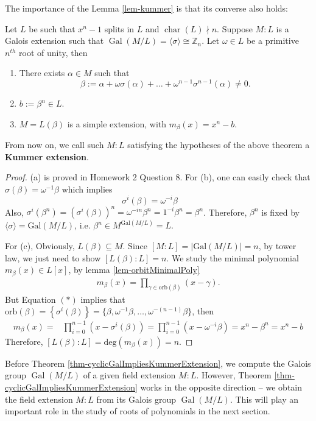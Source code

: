 The importance of the Lemma \ref{lem-kummer} is that its converse also holds:
\begin{theorem}\label{thm-cyclicGalImpliesKummerExtension}
    Let $L$ be such that $x^n-1$ splits in $L$ and $\operatorname{char}(L)\nmid n$. Suppose  $M:L$ is a Galois extension such that $\operatorname{Gal}(M/L) = \langle \sigma \rangle \cong \mathbb{Z}_n$. Let $\omega \in L$ be a primitive $n^{th}$ root of unity, then
\begin{enumerate}
    \item[(a)] There exists $\alpha \in M$ such that
    $$\beta := \alpha + \omega\sigma(\alpha) + \dots + \omega^{n-1}\sigma^{n-1}(\alpha) \neq 0.$$
    \item[(b)] $b := \beta^n \in L$.
    \item[(c)] $M = L(\beta)$ is a simple extension, with $m_{\beta}(x) = x^n - b$.
\end{enumerate}
\end{theorem}
From now on, we call such $M:L$ satisfying the hypotheses of the above theorem a {\bf Kummer extension}.
\begin{proof}
    (a) is proved in Homework 2 Question 8. For (b), one can easily check that \(\sigma(\beta) = \omega^{-1} \beta \) which implies
    \begin{equation*}
        \sigma^i(\beta) = \omega^{-i} \beta     \quad \quad
    \end{equation*}
    Also, \(\sigma^i(\beta^n) = \left(\sigma^i(\beta)\right)^n = \omega^{-in} \beta^n = 1^{-i}\beta^n = \beta^n\). Therefore, \(\beta^n\) is fixed by \(\langle \sigma \rangle = \mathrm{Gal}(M/L)\), i.e. \(\beta^n \in M^{\mathrm{Gal}(M/L)} = L.\)

    For (c), Obviously, \(L(\beta) \subseteq M\). Since \([M:L] = |\mathrm{Gal}(M/L)| = n\), by tower law, we just need to show \(\left[L(\beta):L\right]=n\). We study the minimal polynomial \(m_\beta(x) \in L[x]\), by lemma \ref{lem-orbitMinimalPoly}
    \begin{align*}
        m_\beta(x) = \prod_{\gamma \in \mathrm{orb}(\beta)} (x- \gamma).
    \end{align*}
    But Equation $(*)$ implies that \(\mathrm{orb}(\beta) = \left\{\sigma^i(\beta)\right\} = \{\beta, \omega^{-1}\beta, \dots, \omega^{-(n-1)}\beta\}\), then
    \begin{align*}
        m_{\beta}(x) =& \prod_{i=0}^{n-1}\left(x - \sigma^{i}(\beta)\right) = \prod_{i=0}^{n-1}(x-\omega^{-i}\beta) =x^n - \beta^n = x^n - b
    \end{align*}
    Therefore, \([L(\beta):L] = \mathrm{deg}\left(m_\beta(x)\right) = n\).
\end{proof}
Before Theorem \ref{thm-cyclicGalImpliesKummerExtension}, we compute the Galois group $\operatorname{Gal}(M/L)$ of a given field extension $M:L$. However, Theorem \ref{thm-cyclicGalImpliesKummerExtension} works in the opposite direction -- we obtain the field extension $M:L$ from its Galois group $\operatorname{Gal}(M/L)$. This will play an important role in the study of roots of polynomials in the next section.
